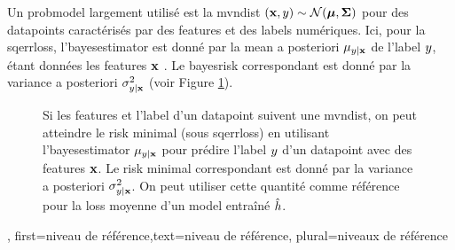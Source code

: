{{		Un \gls{probmodel} largement utilisé est la \gls{mvndist} $\left( {\bf x},y \right) \sim \mathcal{N}({\bm \mu},{\bm \Sigma})$ 
		pour des \glspl{datapoint} caractérisés par des \glspl{feature} et des \glspl{label} numériques.
		Ici, pour la \gls{sqerrloss}, l’\gls{bayesestimator} est donné par la \gls{mean} a posteriori 
		$\mu_{y|{\bf x}}$ de l’\gls{label} $y$, étant données les 
		\glspl{feature} ${\bf x}$ \cite{LC,GrayProbBook}. Le \gls{bayesrisk} correspondant 
		est donné par la \gls{variance} a posteriori 
		$\sigma^{2}_{y|{\bf x}}$ (voir Figure \ref{fig_post_baseline_dict}).
		\begin{figure}[H]
			\begin{center}
			\end{center}
			\caption{Si les \glspl{feature} et l’\gls{label} d’un \gls{datapoint} suivent une \gls{mvndist}, on 
				peut atteindre le \gls{risk} minimal (sous \gls{sqerrloss}) en utilisant l’\gls{bayesestimator} $\mu_{y|{\bf x}}$ 
				pour prédire l’\gls{label} $y$ d’un \gls{datapoint} avec des \glspl{feature} ${\bf x}$. Le \gls{risk} minimal
				correspondant est donné par la \gls{variance} a posteriori $\sigma^{2}_{y|{\bf x}}$. On peut utiliser 
				cette quantité comme référence pour la \gls{loss} moyenne d’un \gls{model} entraîné $\hat{h}$. \label{fig_post_baseline_dict}}
	\end{figure}},
	first={niveau de référence},text={niveau de référence}, plural={niveaux de référence}}

